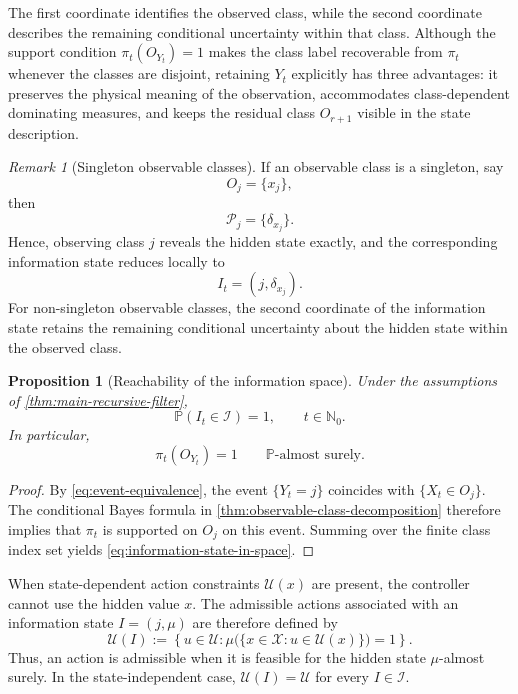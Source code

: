 \documentclass[10pt,twocolumn]{article}
\newtheorem{proposition}{Proposition}
\theoremstyle{remark}
\newtheorem{remark}{Remark}
\newcommand{\N}{\mathbb{N}}
\newcommand{\Pp}{\mathbb{P}}
\newcommand{\Ucal}{\mathcal{U}}
\newcommand{\Xcal}{\mathcal{X}}
\newcommand{\Ical}{\mathcal{I}}
\begin{document}
The first coordinate identifies the observed class, while the second coordinate describes the remaining conditional uncertainty within that class. Although the support condition $\pi_t(O_{Y_t})=1$ makes the class label recoverable from $\pi_t$ whenever the classes are disjoint, retaining $Y_t$ explicitly has three advantages: it preserves the physical meaning of the observation, accommodates class-dependent dominating measures, and keeps the residual class $O_{r+1}$ visible in the state description.

\begin{remark}[Singleton observable classes]
	\label{rem:singleton-observable-classes}
	If an observable class is a singleton, say
	\[
	O_j=\{x_j\},
	\]
	then
	\[
	\mathcal P_j=\{\delta_{x_j}\}.
	\]
	Hence, observing class $j$ reveals the hidden state exactly, and the corresponding information state reduces locally to
	\[
	I_t=(j,\delta_{x_j}).
	\]
	For non-singleton observable classes, the second coordinate of the information state retains the remaining conditional uncertainty about the hidden state within the observed class.
\end{remark}

\begin{proposition}[Reachability of the information space]
	\label{prop:information-state-reachable}
	Under the assumptions of \cref{thm:main-recursive-filter},
	\begin{equation}
		\Pp(I_t\in\Ical)=1,
		\qquad t\in\N_0.
		\label{eq:information-state-in-space}
	\end{equation}
	In particular,
	\begin{equation*}
		\pi_t(O_{Y_t})=1
		\qquad \Pp\text{-almost surely}.
		\label{eq:posterior-support-current-class}
	\end{equation*}
\end{proposition}

\begin{proof}
	By \cref{eq:event-equivalence}, the event $\{Y_t=j\}$ coincides with $\{X_t\in O_j\}$. The conditional Bayes formula in \cref{thm:observable-class-decomposition} therefore implies that $\pi_t$ is supported on $O_j$ on this event. Summing over the finite class index set yields \cref{eq:information-state-in-space}.
\end{proof}

When state-dependent action constraints $\Ucal(x)$ are present, the controller cannot use the hidden value $x$. The admissible actions associated with an information state $I=(j,\mu)$ are therefore defined by
\begin{equation}
	\Ucal(I)
	:=\left\{u\in\Ucal:
	\mu\bigl(\{x\in\Xcal:u\in\Ucal(x)\}\bigr)=1
	\right\}.
	\label{eq:information-admissible-actions}
\end{equation}
Thus, an action is admissible when it is feasible for the hidden state $\mu$-almost surely. In the state-independent case, $\Ucal(I)=\Ucal$ for every $I\in\Ical$.
\end{document}
